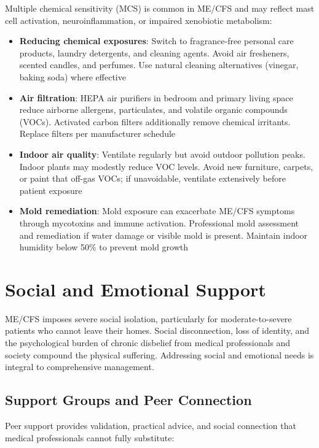 Multiple chemical sensitivity (MCS) is common in ME/CFS and may reflect mast cell activation, neuroinflammation, or impaired xenobiotic metabolism:

\begin{itemize}
    \item \textbf{Reducing chemical exposures}: Switch to fragrance-free personal care products, laundry detergents, and cleaning agents. Avoid air fresheners, scented candles, and perfumes. Use natural cleaning alternatives (vinegar, baking soda) where effective
    \item \textbf{Air filtration}: HEPA air purifiers in bedroom and primary living space reduce airborne allergens, particulates, and volatile organic compounds (VOCs). Activated carbon filters additionally remove chemical irritants. Replace filters per manufacturer schedule
    \item \textbf{Indoor air quality}: Ventilate regularly but avoid outdoor pollution peaks. Indoor plants may modestly reduce VOC levels. Avoid new furniture, carpets, or paint that off-gas VOCs; if unavoidable, ventilate extensively before patient exposure
    \item \textbf{Mold remediation}: Mold exposure can exacerbate ME/CFS symptoms through mycotoxins and immune activation. Professional mold assessment and remediation if water damage or visible mold is present. Maintain indoor humidity below 50\% to prevent mold growth
\end{itemize}

\section{Social and Emotional Support}
\label{sec:social-support}

ME/CFS imposes severe social isolation, particularly for moderate-to-severe patients who cannot leave their homes. Social disconnection, loss of identity, and the psychological burden of chronic disbelief from medical professionals and society compound the physical suffering. Addressing social and emotional needs is integral to comprehensive management.

\subsection{Support Groups and Peer Connection}

Peer support provides validation, practical advice, and social connection that medical professionals cannot fully substitute:

